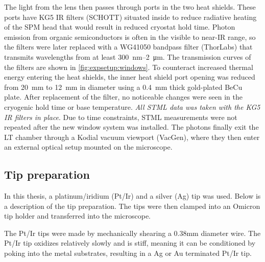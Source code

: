 The light from the lens then passes through ports in the two heat shields. These ports have KG5 \ac{IR} filters (SCHOTT) situated inside to reduce radiative heating of the \ac{SPM} head that would result in reduced cryostat hold time. Photon emission from organic semiconductors is often in the visible to near-\ac{IR} range, so the filters were later replaced with a WG41050 bandpass filter  (ThorLabs) that transmits wavelengths from at least \SI{300}{nm}--\SI{2}{\micro m}. The transmission curves of the filters are shown in \autoref{fig:expsetup:windows}. To counteract increased thermal energy entering the heat shields, the inner heat shield port opening was reduced from \SI{20}{mm} to \SI{12}{mm} in diameter using a \SI{0.4}{mm} thick gold-plated BeCu plate. After replacement of the filter, no noticeable changes were seen in the cryogenic hold time or base temperature. \emph{All \ac{STML} data was taken with the KG5 \ac{IR} filters in place}. Due to time constraints, \ac{STML} measurements were not repeated after the new window system was installed. The photons finally exit the \ac{LT} chamber through a Kodial vacuum viewport (VacGen), where they then enter an external optical setup mounted on the microscope. 



\subsection{Tip preparation}

In this thesis, a platinum/iridium (Pt/Ir) and a silver (Ag) tip was used. Below is a description of the tip preparation. The tips were then clamped into an Omicron tip holder and transferred into the microscope. 

The Pt/Ir tips were made by mechanically shearing a 0.38mm diameter wire. The Pt/Ir tip oxidizes relatively slowly and is stiff, meaning it can be conditioned by poking into the metal substrates, resulting in a Ag or Au terminated Pt/Ir tip. 

